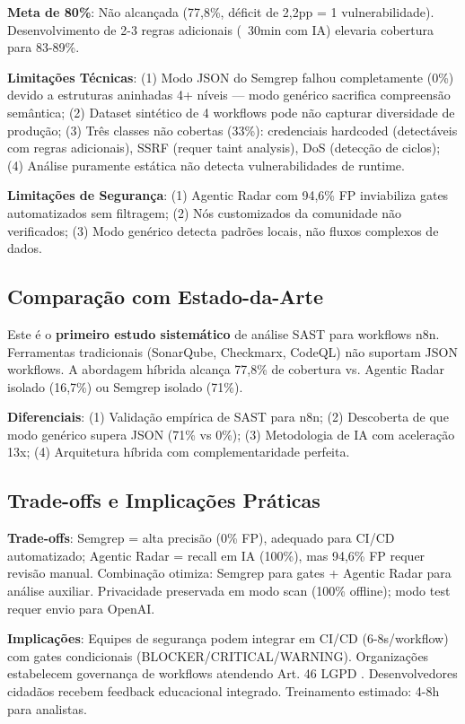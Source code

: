 \documentclass[12pt,a4paper]{article}
\begin{document}
\textbf{Meta de 80\%}: Não alcançada (77,8\%, déficit de 2,2pp = 1 vulnerabilidade). Desenvolvimento de 2-3 regras adicionais (~30min com IA) elevaria cobertura para 83-89\%.

\textbf{Limitações Técnicas}: (1) Modo JSON do Semgrep falhou completamente (0\%) devido a estruturas aninhadas 4+ níveis — modo genérico sacrifica compreensão semântica; (2) Dataset sintético de 4 workflows pode não capturar diversidade de produção; (3) Três classes não cobertas (33\%): credenciais hardcoded (detectáveis com regras adicionais), SSRF (requer taint analysis), DoS (detecção de ciclos); (4) Análise puramente estática não detecta vulnerabilidades de runtime.

\textbf{Limitações de Segurança}: (1) Agentic Radar com 94,6\% FP inviabiliza gates automatizados sem filtragem; (2) Nós customizados da comunidade não verificados; (3) Modo genérico detecta padrões locais, não fluxos complexos de dados.

\subsection{Comparação com Estado-da-Arte}

Este é o \textbf{primeiro estudo sistemático} de análise SAST para workflows n8n. Ferramentas tradicionais (SonarQube, Checkmarx, CodeQL) não suportam JSON workflows. A abordagem híbrida alcança 77,8\% de cobertura vs. Agentic Radar isolado (16,7\%) ou Semgrep isolado (71\%).

\textbf{Diferenciais}: (1) Validação empírica de SAST para n8n; (2) Descoberta de que modo genérico supera JSON (71\% vs 0\%); (3) Metodologia de IA com aceleração 13x; (4) Arquitetura híbrida com complementaridade perfeita.

\subsection{Trade-offs e Implicações Práticas}

\textbf{Trade-offs}: Semgrep = alta precisão (0\% FP), adequado para CI/CD automatizado; Agentic Radar = recall em IA (100\%), mas 94,6\% FP requer revisão manual. Combinação otimiza: Semgrep para gates + Agentic Radar para análise auxiliar. Privacidade preservada em modo scan (100\% offline); modo test requer envio para OpenAI.

\textbf{Implicações}: Equipes de segurança podem integrar em CI/CD (6-8s/workflow) com gates condicionais (BLOCKER/CRITICAL/WARNING). Organizações estabelecem governança de workflows atendendo Art. 46 LGPD \cite{lgpd_art46}. Desenvolvedores cidadãos recebem feedback educacional integrado. Treinamento estimado: 4-8h para analistas.
\end{document}
